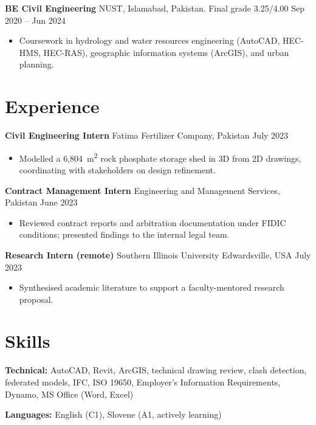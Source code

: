 \documentclass[a4paper,10.5pt]{article}
\newcommand{\datefill}{\dotfill}
\newcommand{\entry}[3]{\vspace{2.5pt}\noindent\textbf{#1} \textbar{} #2 \datefill{} #3\par\vspace{0.5pt}}
\newcommand{\skillrow}[2]{\noindent\textbf{#1:} #2\par\vspace{1pt}}
\begin{document}
\entry{BE Civil Engineering}{NUST, Islamabad, Pakistan. Final grade 3.25/4.00}{Sep 2020 -- Jun 2024}
\begin{itemize}
  \item Coursework in hydrology and water resources engineering (AutoCAD, HEC-HMS,
        HEC-RAS), geographic information systems (ArcGIS), and urban planning.
\end{itemize}

\section{Experience}
\entry{Civil Engineering Intern}{Fatima Fertilizer Company, Pakistan}{July 2023}
\begin{itemize}
  \item Modelled a 6,804~m\textsuperscript{2} rock phosphate storage shed in 3D from
        2D drawings, coordinating with stakeholders on design refinement.
\end{itemize}

\entry{Contract Management Intern}{Engineering and Management Services, Pakistan}{June 2023}
\begin{itemize}
  \item Reviewed contract reports and arbitration documentation under FIDIC
        conditions; presented findings to the internal legal team.
\end{itemize}

\entry{Research Intern (remote)}{Southern Illinois University Edwardsville, USA}{July 2023}
\begin{itemize}
  \item Synthesised academic literature to support a faculty-mentored research proposal.
\end{itemize}

\section{Skills}

\skillrow{Technical}{AutoCAD, Revit, ArcGIS, technical drawing review, clash detection, federated models, IFC, ISO 19650, Employer's Information Requirements, Dynamo, MS Office (Word, Excel)}
\skillrow{Languages}{English (C1), Slovene (A1, actively learning)}
\end{document}
